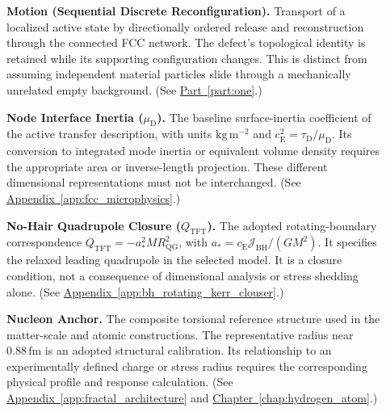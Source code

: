 \begin{description}
\item[] \begin{minipage}[t]{\linewidth}
\textbf{Motion (Sequential Discrete Reconfiguration).} Transport of a localized active state by directionally ordered release and reconstruction through the connected FCC network. The defect's topological identity is retained while its supporting configuration changes. This is distinct from assuming independent material particles slide through a mechanically unrelated empty background.
(See \hyperref[part:one]{Part~\ref*{part:one}}.)
\end{minipage}

\item[] \begin{minipage}[t]{\linewidth}
\textbf{Node Interface Inertia ($\mu_{\mathrm D}$).} The baseline surface-inertia coefficient of the active transfer description, with units $\mathrm{kg\,m^{-2}}$ and $c_{\mathrm E}^2=\tau_{\mathrm D}/\mu_{\mathrm D}$. Its conversion to integrated mode inertia or equivalent volume density requires the appropriate area or inverse-length projection. These different dimensional representations must not be interchanged.
(See \hyperref[app:fcc_microphysics]{Appendix~\ref*{app:fcc_microphysics}}.)
\end{minipage}

\item[] \begin{minipage}[t]{\linewidth}
\textbf{No-Hair Quadrupole Closure ($Q_{\mathrm{TFT}}$).} The adopted rotating-boundary correspondence $Q_{\mathrm{TFT}}=-a_*^2MR_{\mathrm{QG}}^2$, with $a_*=c_{\mathrm E}\mathcal J_{\mathrm{BH}}/(GM^2)$. It specifies the relaxed leading quadrupole in the selected model. It is a closure condition, not a consequence of dimensional analysis or stress shedding alone.
(See \hyperref[app:bh_rotating_kerr_clouser]{Appendix~\ref*{app:bh_rotating_kerr_clouser}}.)
\end{minipage}

\item[] \begin{minipage}[t]{\linewidth}
\textbf{Nucleon Anchor.} The composite torsional reference structure used in the matter-scale and atomic constructions. The representative radius near $0.88\,\mathrm{fm}$ is an adopted structural calibration. Its relationship to an experimentally defined charge or stress radius requires the corresponding physical profile and response calculation.
(See \hyperref[app:fractal_architecture]{Appendix~\ref*{app:fractal_architecture}} and \hyperref[chap:hydrogen_atom]{Chapter~\ref*{chap:hydrogen_atom}}.)
\end{minipage}


\end{description}

